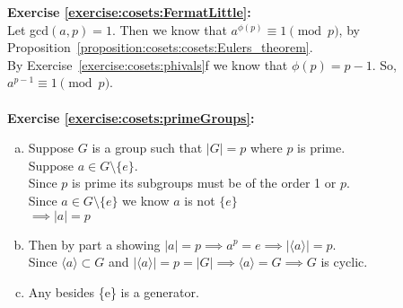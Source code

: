 \noindent\textbf{Exercise \ref{exercise:cosets:FermatLittle}:}
\\
Let gcd$(a, p) = 1$.  Then we know that $a^{\phi(p)} \equiv 1 \pmod{p}$, by Proposition~\ref{proposition:cosets:cosets:Eulers_theorem}.
\\
By Exercise~\ref{exercise:cosets:phivals}f we know that $\phi(p) = p - 1$. So, $a^{p - 1} \equiv 1 \pmod{p}$.
\\
\\

\noindent\textbf{Exercise \ref{exercise:cosets:primeGroups}:}
\begin{enumerate}[(a)]
\item
Suppose $G$ is a group such that $|G| = p$ where $p$ is prime.
\\
Suppose $a \in G \setminus \{e\}$.
\\
Since $p$ is prime its subgroups must be of the order 1 or $p$.
\\
Since $a \in G \setminus \{e\}$ we know $a$ is not $\{e\}$
\\
$\implies |a| = p$

\item
Then by part a showing $|a| = p \implies a^p = e \implies | \langle a \rangle | = p$.
\\
Since $\langle a \rangle \subset G$ and $| \langle a \rangle | = p = |G| \implies \langle a \rangle = G \implies G$ is cyclic.

\item
Any besides \{e\} is a generator.
\end{enumerate}

